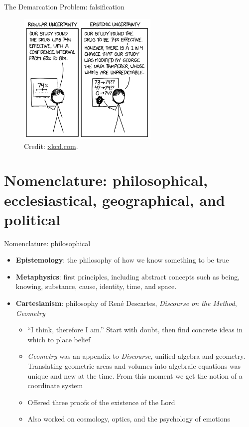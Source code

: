 \documentclass{beamer}
\begin{document}
\begin{frame}{The Demarcation Problem: falsification}
\small
\begin{figure}
\centering
\includegraphics[width=0.6\textwidth]{figures/george.png}
\caption{\label{fig:george} Credit: \url{xkcd.com}.}
\end{figure}
\end{frame}

\section{Nomenclature: philosophical, ecclesiastical, geographical, and political}

\begin{frame}{Nomenclature: philosophical}
\small
\begin{itemize}
\item \textbf{Epistemology}: the philosophy of how we know something to be true
\item \textbf{Metaphysics}: first principles, including abstract concepts such as being, knowing, substance, cause, identity, time, and space.
\item \textbf{Cartesianism}: philosophy of Ren\'{e} Descartes, \textit{Discourse on the Method}, \textit{Geometry}
\begin{itemize}
\footnotesize
\item ``I think, therefore I am.'' Start with doubt, then find concrete ideas in which to place belief
\item \textit{Geometry} was an appendix to \textit{Discourse}, unified algebra and geometry. Translating geometric areas and volumes into algebraic equations was unique and new at the time. From this moment we get the notion of a coordinate system
\item Offered three proofs of the existence of the Lord
\item Also worked on cosmology, optics, and the psychology of emotions
\end{itemize}
\end{itemize}
\end{frame}
\end{document}
